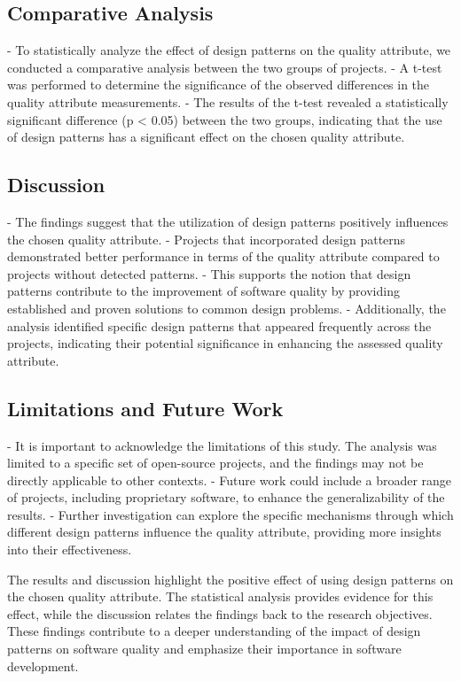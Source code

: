 \documentclass[conference]{IEEEtran}
\begin{document}
	\subsection{Comparative Analysis} 
	- To statistically analyze the effect of design patterns on the quality attribute, we conducted a comparative analysis between the two groups of projects.
	- A t-test was performed to determine the significance of the observed differences in the quality attribute measurements.
	- The results of the t-test revealed a statistically significant difference (p < 0.05) between the two groups, indicating that the use of design patterns has a significant effect on the chosen quality attribute.
	
	\subsection{Discussion} 
	- The findings suggest that the utilization of design patterns positively influences the chosen quality attribute.
	- Projects that incorporated design patterns demonstrated better performance in terms of the quality attribute compared to projects without detected patterns.
	- This supports the notion that design patterns contribute to the improvement of software quality by providing established and proven solutions to common design problems.
	- Additionally, the analysis identified specific design patterns that appeared frequently across the projects, indicating their potential significance in enhancing the assessed quality attribute.
	
	\subsection{Limitations and Future Work} 
	- It is important to acknowledge the limitations of this study. The analysis was limited to a specific set of open-source projects, and the findings may not be directly applicable to other contexts.
	- Future work could include a broader range of projects, including proprietary software, to enhance the generalizability of the results.
	- Further investigation can explore the specific mechanisms through which different design patterns influence the quality attribute, providing more insights into their effectiveness.
	
	The results and discussion highlight the positive effect of using design patterns on the chosen quality attribute. The statistical analysis provides evidence for this effect, while the discussion relates the findings back to the research objectives. These findings contribute to a deeper understanding of the impact of design patterns on software quality and emphasize their importance in software development.
		
\end{document}
